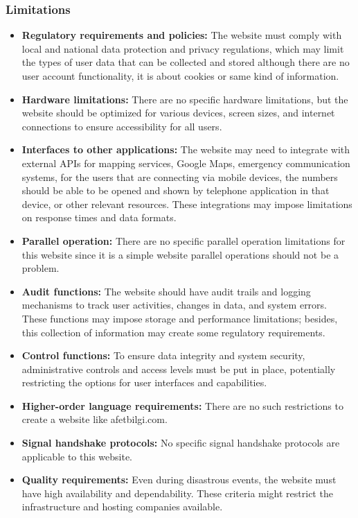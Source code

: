 \documentclass[11pt,a4paper]{article}
\begin{document}
\subsubsection{Limitations}
\begin{itemize}
    \item \textbf{Regulatory requirements and policies:} The website must comply with local and national data protection and privacy regulations, which may limit the types of user data that can be collected and stored although there are no user account functionality, it is about cookies or same kind of information.
    \item \textbf{Hardware limitations:} There are no specific hardware limitations, but the website should be optimized for various devices, screen sizes, and internet connections to ensure accessibility for all users.
    \item \textbf{Interfaces to other applications:} The website may need to integrate with external APIs for mapping services, Google Maps, emergency communication systems, for the users that are connecting via mobile devices, the numbers should be able to be opened and shown by telephone application in that device, or other relevant resources. These integrations may impose limitations on response times and data formats.
    \item \textbf{Parallel operation:} There are no specific parallel operation limitations for this website since it is a simple website parallel operations should not be a problem.
    \item \textbf{Audit functions:} The website should have audit trails and logging mechanisms to track user activities, changes in data, and system errors. These functions may impose storage and performance limitations; besides, this collection of information may create some regulatory requirements.
    \item \textbf{Control functions:} To ensure data integrity and system security, administrative controls and access levels must be put in place, potentially restricting the options for user interfaces and capabilities.
    \item \textbf{Higher-order language requirements:} There are no such restrictions to create a website like afetbilgi.com.
    \item \textbf{Signal handshake protocols:} No specific signal handshake protocols are applicable to this website.
    \item \textbf{Quality requirements:} Even during disastrous events, the website must have high availability and dependability. These criteria might restrict the infrastructure and hosting companies available.

\end{itemize}
\end{document}
